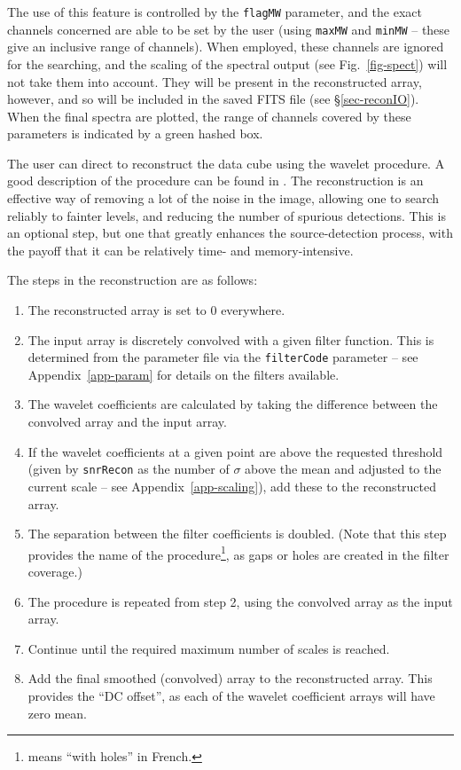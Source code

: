 The use of this feature is controlled by the \texttt{flagMW}
parameter, and the exact channels concerned are able to be set by the
user (using \texttt{maxMW} and \texttt{minMW} -- these give an
inclusive range of channels). When employed, these channels are
ignored for the searching, and the scaling of the spectral output (see
Fig.~\ref{fig-spect}) will not take them into account. They will be
present in the reconstructed array, however, and so will be included
in the saved FITS file (see \S\ref{sec-reconIO}). When the final
spectra are plotted, the range of channels covered by these parameters
is indicated by a green hashed box.

\label{sec-recon}

The user can direct \duchamp to reconstruct the data cube using the
\atrous wavelet procedure. A good description of the procedure can be
found in \citet{starck02:book}. The reconstruction is an effective way
of removing a lot of the noise in the image, allowing one to search
reliably to fainter levels, and reducing the number of spurious
detections. This is an optional step, but one that greatly enhances
the source-detection process, with the payoff that it can be
relatively time- and memory-intensive.


The steps in the \atrous reconstruction are as follows:
\begin{enumerate}
\item The reconstructed array is set to 0 everywhere.
\item The input array is discretely convolved with a given filter
  function. This is determined from the parameter file via the
  \texttt{filterCode} parameter -- see Appendix~\ref{app-param} for
  details on the filters available.
\item The wavelet coefficients are calculated by taking the difference
  between the convolved array and the input array.
\item If the wavelet coefficients at a given point are above the
  requested threshold (given by \texttt{snrRecon} as the number of
  $\sigma$ above the mean and adjusted to the current scale -- see
  Appendix~\ref{app-scaling}), add these to the reconstructed array.
\item The separation between the filter coefficients is doubled. (Note
  that this step provides the name of the procedure\footnote{\atrous
  means ``with holes'' in French.}, as gaps or holes are created in
  the filter coverage.)
\item The procedure is repeated from step 2, using the convolved array
  as the input array.
\item Continue until the required maximum number of scales is reached.
\item Add the final smoothed (\ie convolved) array to the
  reconstructed array. This provides the ``DC offset'', as each of the
  wavelet coefficient arrays will have zero mean.
\end{enumerate}

